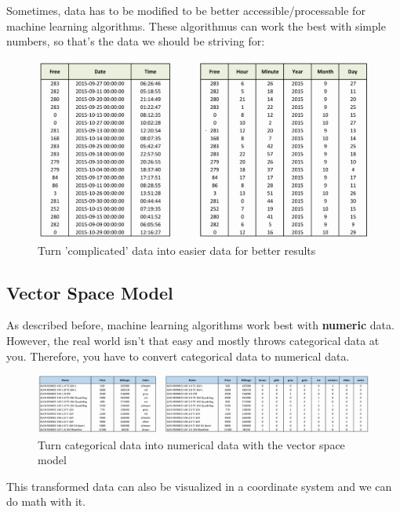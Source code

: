 \documentclass[11pt]{article}
\begin{document}
Sometimes, data has to be modified to be better accessible/processable for machine learning algorithms. These algorithmus can work the best with simple numbers, so that's the data we should be striving for:

\begin{figure}[htb!]
    \centering
    \includegraphics[keepaspectratio=true, width=\linewidth]{feature_engineering.png}
    \caption{Turn 'complicated' data into easier data for better results}
    \label{fig:feature_engineering}
\end{figure}

\subsection{Vector Space Model}

As described before, machine learning algorithms work best with \textbf{numeric} data. However, the real world isn't that easy and mostly throws categorical data at you. Therefore, you have to convert categorical data to numerical data.

\begin{figure}[htb!]
    \centering
    \includegraphics[keepaspectratio=true, width=\linewidth]{vector_space_model.png}
    \caption{Turn categorical data into numerical data with the vector space model}
    \label{fig:vector_space_modefig}
\end{figure}

This transformed data can also be visualized in a coordinate system and we can do math with it.
\end{document}
